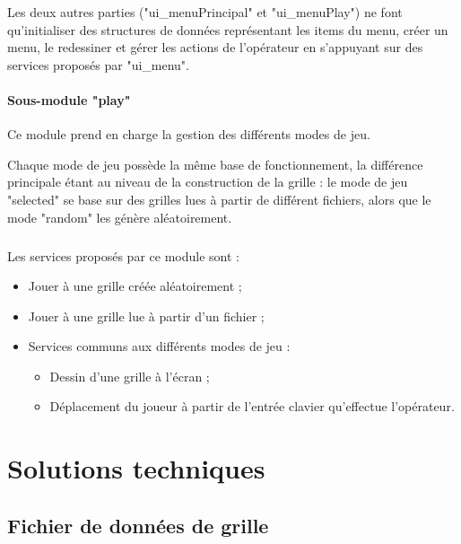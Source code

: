 \documentclass{book}
\begin{document}
Les deux autres parties ("ui\_menuPrincipal" et "ui\_menuPlay") ne font qu'initialiser des structures de données représentant les items du menu, créer un menu, le redessiner et gérer les actions de l'opérateur en s'appuyant sur des services proposés par "ui\_menu".


\subsubsection{Sous-module "play"}

Ce module prend en charge la gestion des différents modes de jeu.

Chaque mode de jeu possède la même base de fonctionnement, la différence principale étant au niveau de la construction de la grille : le mode de jeu "selected" se base sur des grilles lues à partir de différent fichiers, alors que le mode "random" les génère aléatoirement.

\paragraph{}
Les services proposés par ce module sont :
\begin{itemize}
	\item Jouer à une grille créée aléatoirement ;
	\item Jouer à une grille lue à partir d'un fichier ;
	\item Services communs aux différents modes de jeu :
	\begin{itemize}
		\item Dessin d'une grille à l'écran ;
		\item Déplacement du joueur à partir de l'entrée clavier qu'effectue l'opérateur.
	\end{itemize}
\end{itemize}




\chapter{Solutions techniques}

\section{Fichier de données de grille}
\end{document}
